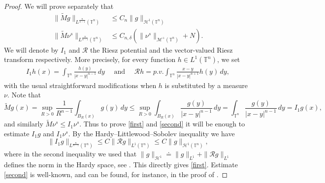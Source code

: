 \documentclass[10pt,reqno]{amsart}
\numberwithin{equation}{section}
\newcommand{\T}{\mathbb{T}}
\theoremstyle{plain}
\theoremstyle{definition}
\theoremstyle{remark}
\begin{document}
\begin{proof}
We will prove separately that 
\begin{align}
\| \tilde Mg\|_{L^\frac{n}{n - 1}(\T^n)}&\leq C_n\|g\|_{\mathcal{H}^1(\T^n)}\label{first}\\
\|\tilde M\nu^s\|_{L^\frac{n}{n - 1}(\T^n)}&\leq C_{n,\delta}\left(\|\nu^s\|_{\mathcal{M}^+(\T^n)}+N \right)\label{second}.
\end{align}
We will denote by $I_1$ and $\mathcal{R}$ the Riesz potential and the vector-valued Riesz transform respectively.  More precisely, for every function $h\in L^1(\T^n)$, we set 
\begin{align*}
I_1 h(x)=\int_{\T^n} \frac{h(y)}{|x-y|^{n-1}}\, dy \quad \text{ and } \quad \mathcal{R} h=p.v. \int_{\T^n} \frac{x-y}{|x-y|^{n+1}} h(y)\, dy,
\end{align*}
with the usual straightforward modifications when $h$ is substituted by a measure $\nu$. Note that
$$
\tilde M g(x)=\sup_{R>0}\frac{1}{R^{n-1}}\int_{B_R(x)} g(y)\,dy\leq \sup_{R>0}\int_{B_R(x)} \frac{g(y)}{|x-y|^{n-1}}\,dy=\int_{\T^n} \frac{g(y)}{|x-y|^{n-1}}\,dy=I_1 g(x),
$$
and similarly $\tilde M \nu^s\leq I_1\nu^s$. Thus to prove \eqref{first} and \eqref{second} it will be enough to estimate $I_1 g$ and $I_1\nu^s$. 
By the Hardy--Littlewood--Sobolev inequality we have 
\begin{equation}
\label{Rieszinhardy}
\|I_1 g\|_{L^\frac{n}{n - 1}(\T^n)}\leq C\|\mathcal{R}g\|_{L^1(\T^n)}\leq C \|g\|_{\mathcal{H}^1(\T^n)},
\end{equation}
where in the second inequality we used that $\|g\|_{\mathcal{H}^1}\doteq \|g\|_{L^1}+\|\mathcal{R} g\|_{L^1}$ defines the norm in the Hardy space, see \cite{FEF}.  This directly gives \eqref{first}. Estimate \eqref{second} is well-known, and can be found, for instance, in the proof of \cite[Prop. 6.1]{Sil05}.
\end{proof}





\end{document}
